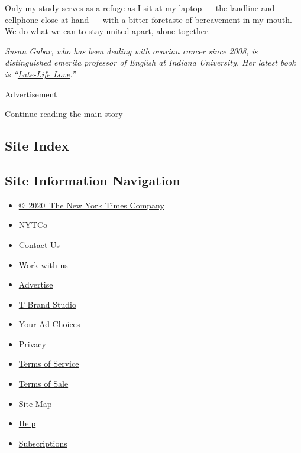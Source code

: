 Only my study serves as a refuge as I sit at my laptop --- the landline
and cellphone close at hand --- with a bitter foretaste of bereavement
in my mouth. We do what we can to stay united apart, alone together.

\emph{Susan Gubar, who has been dealing with ovarian cancer since 2008,
is distinguished emerita professor of English at Indiana University. Her
latest book is
``}\href{https://www.nytimes.com/2018/12/28/books/review/susan-gubar-late-life-love.html?module=inline}{\emph{Late-Life
Love}}\emph{.''}

Advertisement

\protect\hyperlink{after-bottom}{Continue reading the main story}

\hypertarget{site-index}{%
\subsection{Site Index}\label{site-index}}

\hypertarget{site-information-navigation}{%
\subsection{Site Information
Navigation}\label{site-information-navigation}}

\begin{itemize}
\tightlist
\item
  \href{https://help.nytimes.com/hc/en-us/articles/115014792127-Copyright-notice}{©~2020~The
  New York Times Company}
\end{itemize}

\begin{itemize}
\tightlist
\item
  \href{https://www.nytco.com/}{NYTCo}
\item
  \href{https://help.nytimes.com/hc/en-us/articles/115015385887-Contact-Us}{Contact
  Us}
\item
  \href{https://www.nytco.com/careers/}{Work with us}
\item
  \href{https://nytmediakit.com/}{Advertise}
\item
  \href{http://www.tbrandstudio.com/}{T Brand Studio}
\item
  \href{https://www.nytimes.com/privacy/cookie-policy\#how-do-i-manage-trackers}{Your
  Ad Choices}
\item
  \href{https://www.nytimes.com/privacy}{Privacy}
\item
  \href{https://help.nytimes.com/hc/en-us/articles/115014893428-Terms-of-service}{Terms
  of Service}
\item
  \href{https://help.nytimes.com/hc/en-us/articles/115014893968-Terms-of-sale}{Terms
  of Sale}
\item
  \href{https://spiderbites.nytimes.com}{Site Map}
\item
  \href{https://help.nytimes.com/hc/en-us}{Help}
\item
  \href{https://www.nytimes.com/subscription?campaignId=37WXW}{Subscriptions}
\end{itemize}
